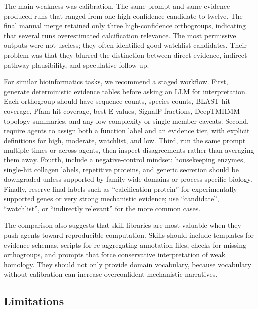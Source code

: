 \documentclass[11pt]{article}
\begin{document}
The main weakness was calibration. The same prompt and same evidence produced runs that ranged from one high-confidence candidate to twelve. The final manual merge retained only three high-confidence orthogroups, indicating that several runs overestimated calcification relevance. The most permissive outputs were not useless; they often identified good watchlist candidates. Their problem was that they blurred the distinction between direct evidence, indirect pathway plausibility, and speculative follow-up.

For similar bioinformatics tasks, we recommend a staged workflow. First, generate deterministic evidence tables before asking an LLM for interpretation. Each orthogroup should have sequence counts, species counts, BLAST hit coverage, Pfam hit coverage, best E-values, SignalP fractions, DeepTMHMM topology summaries, and any low-complexity or single-member caveats. Second, require agents to assign both a function label and an evidence tier, with explicit definitions for high, moderate, watchlist, and low. Third, run the same prompt multiple times or across agents, then inspect disagreements rather than averaging them away. Fourth, include a negative-control mindset: housekeeping enzymes, single-hit collagen labels, repetitive proteins, and generic secretion should be downgraded unless supported by family-wide domains or process-specific biology. Finally, reserve final labels such as ``calcification protein'' for experimentally supported genes or very strong mechanistic evidence; use ``candidate'', ``watchlist'', or ``indirectly relevant'' for the more common cases.

The comparison also suggests that skill libraries are most valuable when they push agents toward reproducible computation. Skills should include templates for evidence schemas, scripts for re-aggregating annotation files, checks for missing orthogroups, and prompts that force conservative interpretation of weak homology. They should not only provide domain vocabulary, because vocabulary without calibration can increase overconfident mechanistic narratives.

\subsection{Limitations}
\end{document}
